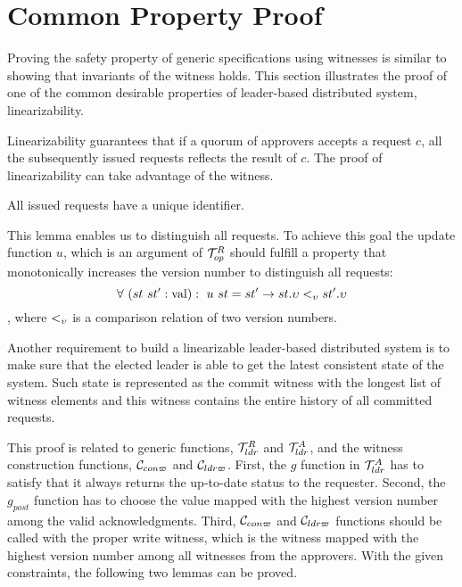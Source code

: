 \vspace{-0.5em}

\section{Common Property Proof}
\label{sec:prove-safety-with-witness}

Proving the safety property of generic specifications using witnesses is 
similar to showing that invariants of the witness holds.
This section illustrates the proof of one of the common desirable properties
of leader-based distributed system, linearizability.

Linearizability guarantees that if a quorum of approvers accepts a request $c$, 
all the subsequently issued requests reflects the result of $c$. 
The proof of linearizability can take advantage of the witness. 
\vspace{-0.1em}

\begin{lemma}
All issued requests have a unique identifier.
\end{lemma}

This lemma enables us to distinguish all requests. To achieve this goal the 
update function $u$, which is an argument of $\mathcal{T}^{R}_{op}$ should fulfill a 
property that monotonically increases the version number to distinguish all
requests:
$$\forall \ (st \ st' : \mathrm{val}) : \ u \ st = st' \rightarrow st.\upsilon
<_{\upsilon} st'.\upsilon$$,
where $<_{\upsilon}$ is a comparison relation of two version numbers.

Another requirement to build a linearizable leader-based distributed system 
is to make sure that the elected leader is able to get the latest consistent
state of the system. Such state is represented as the commit witness with the
longest list of witness elements and this witness contains the entire history of
all committed requests. 

This proof is related to generic functions, $\mathcal{T}^{R}_{ldr}$ and $\mathcal{T}^{A}_{ldr}$, 
and the witness construction functions, $\mathcal{C}_{con\varpi}$ and $\mathcal{C}_{ldr\varpi}$.
First, the $g$ function in $\mathcal{T}^{A}_{ldr}$ has to satisfy that  
it always returns the up-to-date status to the requester.
Second, the $g_{post}$ function has to choose the value mapped with the highest 
version number among the valid acknowledgments. 
Third, $\mathcal{C}_{con\varpi}$ and $\mathcal{C}_{ldr\varpi}$ functions should be called with the proper 
write witness, which is the witness mapped with the highest version number 
among all witnesses from the approvers. 
With the given constraints, the following two lemmas can be proved.
\vspace{-0.2em}

